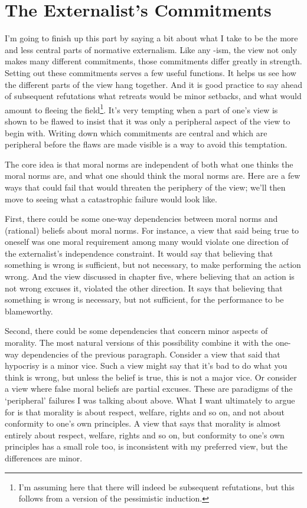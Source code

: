 \section{The Externalist's Commitments}
\label{theexternalistscommitments}

I'm going to finish up this part by saying a bit about what I take to be the more and less central parts of normative externalism. Like any -ism, the view not only makes many different commitments, those commitments differ greatly in strength. Setting out these commitments serves a few useful functions. It helps us see how the different parts of the view hang together. And it is good practice to say ahead of subsequent refutations what retreats would be minor setbacks, and what would amount to fleeing the field\footnote{I'm assuming here that there will indeed be subsequent refutations, but this follows from a version of the pessimistic induction.}. It's very tempting when a part of one's view is shown to be flawed to insist that it was only a peripheral aspect of the view to begin with. Writing down which commitments are central and which are peripheral before the flaws are made visible is a way to avoid this temptation.

The core idea is that moral norms are independent of both what one thinks the moral norms are, and what one should think the moral norms are. Here are a few ways that could fail that would threaten the periphery of the view; we'll then move to seeing what a catastrophic failure would look like.

First, there could be some one-way dependencies between moral norms and (rational) beliefs about moral norms. For instance, a view that said being true to oneself was one moral requirement among many would violate one direction of the externalist's independence constraint. It would say that believing that something is wrong is sufficient, but not necessary, to make performing the action wrong. And the view discussed in chapter five, where believing that an action is not wrong excuses it, violated the other direction. It says that believing that something is wrong is necessary, but not sufficient, for the performance to be blameworthy.

Second, there could be some dependencies that concern minor aspects of morality. The most natural versions of this possibility combine it with the one-way dependencies of the previous paragraph. Consider a view that said that hypocrisy is a minor vice. Such a view might say that it's bad to do what you think is wrong, but unless the belief is true, this is not a major vice. Or consider a view where false moral beliefs are partial excuses. These are paradigms of the `peripheral' failures I was talking about above. What I want ultimately to argue for is that morality is about respect, welfare, rights and so on, and not about conformity to one's own principles. A view that says that morality is almost entirely about respect, welfare, rights and so on, but conformity to one's own principles has a small role too, is inconsistent with my preferred view, but the differences are minor.

